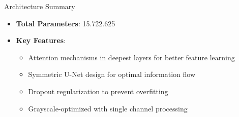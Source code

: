 \begin{frame}{Architecture Summary}
    \begin{itemize}
        \item \textbf{Total Parameters}: 15.722.625
        \item \textbf{Key Features}:
              \begin{itemize}
                  \item Attention mechanisms in deepest layers for better feature learning
                  \item Symmetric U-Net design for optimal information flow
                  \item Dropout regularization to prevent overfitting
                  \item Grayscale-optimized with single channel processing
              \end{itemize}
    \end{itemize}
\end{frame}